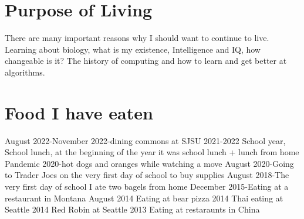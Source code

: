 \documentclass[11pt]{scrartcl}
\begin{document}
\section{Purpose of Living}
There are many important reasons why I should want to continue to live. Learning about biology, what is my existence, Intelligence and IQ, how changeable is it? The history of computing and how to learn and get better at algorithms.
\section{Food I have eaten}
August 2022-November 2022-dining commons at SJSU
2021-2022 School year, School lunch, at the beginning of the year it was school lunch + lunch from home
Pandemic 2020-hot dogs and oranges while watching a move
August 2020-Going to Trader Joes on the very first day of school to buy supplies
August 2018-The very first day of school I ate two bagels from home
December 2015-Eating at a restaurant in Montana
August 2014 Eating at bear pizza
2014 Thai eating at Seattle
2014 Red Robin at Seattle
2013 Eating at restaraunts in China
\end{document}

